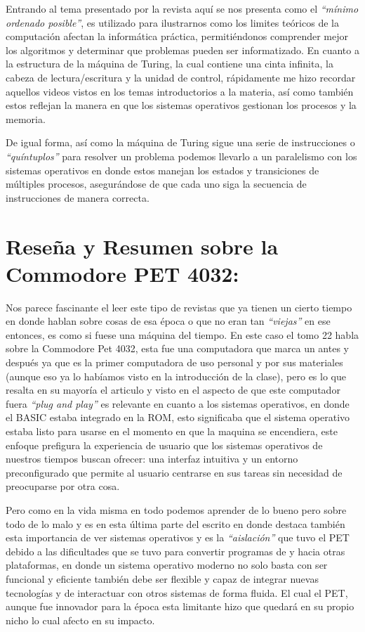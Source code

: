 \documentclass[letterpaper, 12 pt]{article} %
\begin{document}
Entrando al tema presentado por la revista aquí se nos presenta como el \textit{“mínimo ordenado posible”}, es utilizado para ilustrarnos como los limites teóricos de la computación afectan la informática práctica, permitiéndonos comprender mejor los algoritmos y determinar que problemas pueden ser informatizado. En cuanto a la estructura de la máquina de Turing, la cual contiene una cinta infinita, la cabeza de lectura/escritura y la unidad de control, rápidamente me hizo recordar aquellos videos vistos en los temas introductorios a la materia, así como también estos reflejan la manera en que los sistemas operativos gestionan los procesos y la memoria.

De igual forma, así como la máquina de Turing sigue una serie de instrucciones o \textit{“quíntuplos”} para resolver un problema podemos llevarlo a un paralelismo con los sistemas operativos en donde estos manejan los estados y transiciones de múltiples procesos, asegurándose de que cada uno siga la secuencia de instrucciones de manera correcta.

\section*{Reseña y Resumen sobre la Commodore PET 4032:}
Nos parece fascinante el leer este tipo de revistas que ya tienen un cierto tiempo en donde hablan sobre cosas de esa época o que no eran tan \textit{“viejas”} en ese entonces, es como si fuese una máquina del tiempo. En este caso el tomo 22 habla sobre la Commodore Pet 4032, esta fue una computadora que marca un antes y después ya que es la primer computadora de uso personal y por sus materiales (aunque eso ya lo habíamos visto en la introducción de la clase), pero es lo que resalta en su mayoría el articulo y visto en el aspecto de que este computador fuera \textit{“plug and play”} es relevante en cuanto a los sistemas operativos, en donde el BASIC estaba integrado en la ROM, esto significaba que el sistema operativo estaba listo para usarse en el momento en que la maquina se encendiera, este enfoque prefigura la experiencia de usuario que los sistemas operativos de nuestros tiempos buscan ofrecer: una interfaz intuitiva y un entorno preconfigurado que permite al usuario centrarse en sus tareas sin necesidad de preocuparse por otra cosa.

Pero como en la vida misma en todo podemos aprender de lo bueno pero sobre todo de lo malo y es en esta última parte del escrito en donde destaca también esta importancia de ver sistemas operativos y es la \textit{“aislación”} que tuvo el PET debido a las dificultades que se tuvo para convertir programas de y hacia otras plataformas, en donde un sistema operativo moderno no solo basta con ser funcional y eficiente también debe ser flexible y capaz de integrar nuevas tecnologías y de interactuar con otros sistemas de forma fluida. El cual el PET, aunque fue innovador para la época esta limitante hizo que quedará en su propio nicho lo cual afecto en su impacto.
\end{document}
